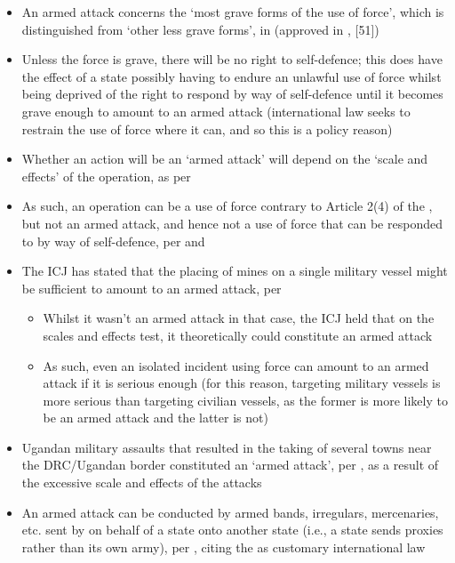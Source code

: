 \begin{itemize}
    \item An armed attack concerns the `most grave forms of the use of force', which is distinguished from `other less grave forms', in  (approved in , [51])
    \item Unless the force is grave, there will be no right to self-defence; this does have the effect of a state possibly having to endure an unlawful use of force whilst being deprived of the right to respond by way of self-defence until it becomes grave enough to amount to an armed attack (international law seeks to restrain the use of force where it can, and so this is a policy reason)
    \item Whether an action will be an `armed attack' will depend on the `scale and effects' of the operation, as per 
    \item As such, an operation can be a use of force contrary to Article 2(4) of the , but not an armed attack, and hence not a use of force that can be responded to by way of self-defence, per  and 
    \item The ICJ has stated that the placing of mines on a single military vessel might be sufficient to amount to an armed attack, per 
    \begin{itemize}
        \item Whilst it wasn't an armed attack in that case, the ICJ held that on the scales and effects test, it theoretically could constitute an armed attack
        \item As such, even an isolated incident using force can amount to an armed attack if it is serious enough (for this reason, targeting military vessels is more serious than targeting civilian vessels, as the former is more likely to be an armed attack and the latter is not)
    \end{itemize}
    \item Ugandan military assaults that resulted in the taking of several towns near the DRC/Ugandan border constituted an `armed attack', per , as a result of the excessive scale and effects of the attacks
    \item An armed attack can be conducted by armed bands, irregulars, mercenaries, etc. sent by on behalf of a state onto another state (i.e., a state sends proxies rather than its own army), per , citing the  as customary international law

\end{itemize}
